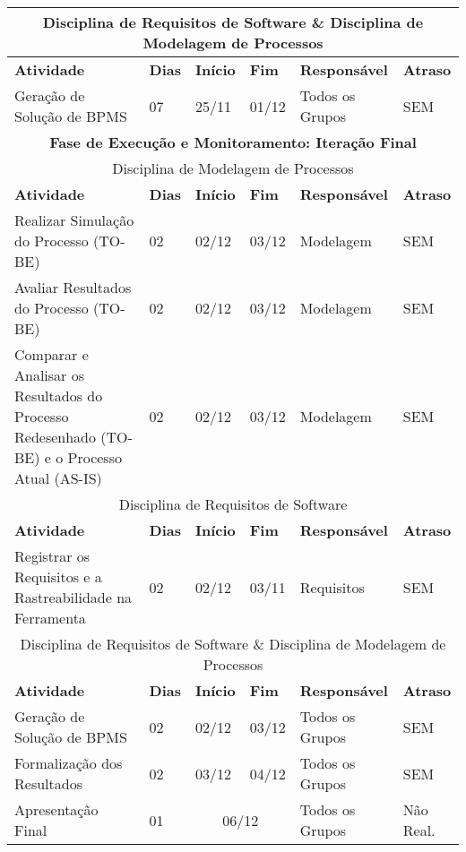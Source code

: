 \begin{center}
	\begin{tabular}{|m{10cm}|m{1cm}|m{1cm}|m{1cm}|m{4cm}|m{2cm}|}
	\hline
	\multicolumn{6}{|c|}{Disciplina de Requisitos de Software \& Disciplina de Modelagem de Processos} \\ \hline
	\textbf{Atividade} & \textbf{Dias} & \textbf{Início} & \textbf{Fim} & \textbf{Responsável} & \textbf{Atraso} \\ \hline
	Geração de Solução de BPMS & 07 & 25/11 & 01/12 & Todos os Grupos & SEM \\ \hline
	\multicolumn{6}{|c|}{\textbf{Fase de Execução e Monitoramento: Iteração Final}} \\
	\hline
	\multicolumn{6}{|c|}{Disciplina de Modelagem de Processos} \\
	\hline
	\textbf{Atividade} & \textbf{Dias} & \textbf{Início} & \textbf{Fim} & \textbf{Responsável} & \textbf{Atraso} \\ \hline
	Realizar Simulação do Processo (TO-BE) & 02 & 02/12 & 03/12 & Modelagem & SEM \\ \hline
	Avaliar Resultados do Processo (TO-BE) & 02 & 02/12 & 03/12 & Modelagem & SEM \\ \hline
	Comparar e Analisar os Resultados do Processo Redesenhado (TO-BE) e o Processo Atual (AS-IS) & 02 & 02/12 & 03/12 & Modelagem & SEM \\ \hline
	\multicolumn{6}{|c|}{Disciplina de Requisitos de Software} \\
	\hline
	\textbf{Atividade} & \textbf{Dias} & \textbf{Início} & \textbf{Fim} & \textbf{Responsável} & \textbf{Atraso} \\ \hline
	Registrar os Requisitos e a Rastreabilidade na Ferramenta & 02 & 02/12 & 03/11 & Requisitos & SEM \\ \hline
	\multicolumn{6}{|c|}{Disciplina de Requisitos de Software \& Disciplina de Modelagem de Processos} \\ \hline
	\textbf{Atividade} & \textbf{Dias} & \textbf{Início} & \textbf{Fim} & \textbf{Responsável} & \textbf{Atraso} \\ \hline
	Geração de Solução de BPMS & 02 & 02/12 & 03/12 & Todos os Grupos & SEM \\ \hline
	Formalização dos Resultados & 02 & 03/12 & 04/12 & Todos os Grupos & SEM \\ \hline
	Apresentação Final & 01 & \multicolumn{2}{c|}{06/12} & Todos os Grupos & Não Real. \\ \hline
	\end{tabular}
\end{center}